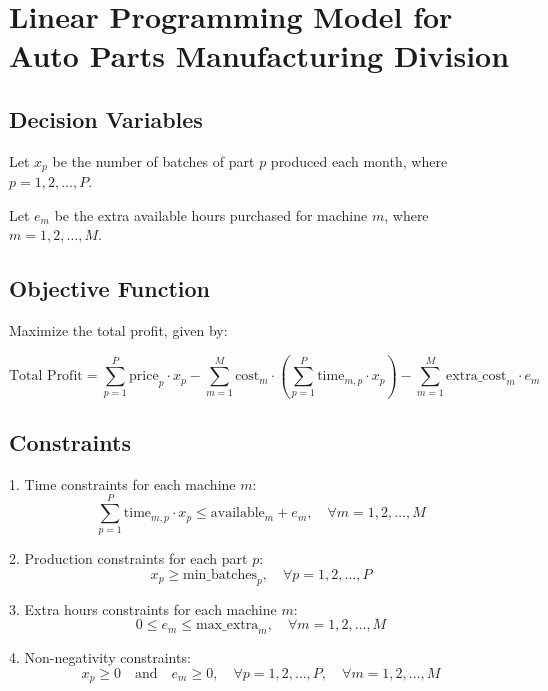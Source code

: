 \documentclass{article}
\begin{document}
\section*{Linear Programming Model for Auto Parts Manufacturing Division}

\subsection*{Decision Variables}
Let \( x_p \) be the number of batches of part \( p \) produced each month, where \( p = 1, 2, \ldots, P \).

Let \( e_m \) be the extra available hours purchased for machine \( m \), where \( m = 1, 2, \ldots, M \).

\subsection*{Objective Function}
Maximize the total profit, given by:

\[
\text{Total Profit} = \sum_{p=1}^{P} \text{price}_p \cdot x_p - \sum_{m=1}^{M} \text{cost}_m \cdot \left( \sum_{p=1}^{P} \text{time}_{m,p} \cdot x_p \right) - \sum_{m=1}^{M} \text{extra\_cost}_m \cdot e_m
\]

\subsection*{Constraints}
1. Time constraints for each machine \( m \):
   \[
   \sum_{p=1}^{P} \text{time}_{m,p} \cdot x_p \leq \text{available}_m + e_m, \quad \forall m = 1, 2, \ldots, M
   \]

2. Production constraints for each part \( p \):
   \[
   x_p \geq \text{min\_batches}_p, \quad \forall p = 1, 2, \ldots, P
   \]

3. Extra hours constraints for each machine \( m \):
   \[
   0 \leq e_m \leq \text{max\_extra}_m, \quad \forall m = 1, 2, \ldots, M
   \]

4. Non-negativity constraints:
   \[
   x_p \geq 0 \quad \text{and} \quad e_m \geq 0, \quad \forall p = 1, 2, \ldots, P, \quad \forall m = 1, 2, \ldots, M
   \]
\end{document}
